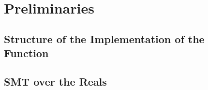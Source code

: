 \section{Preliminaries}

\subsection{Structure of the Implementation of the Function}

\subsection{SMT over the Reals}

